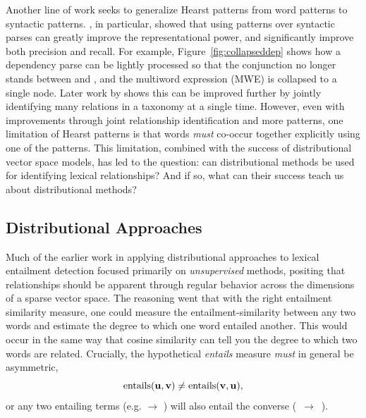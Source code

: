 Another line of work seeks to generalize Hearst patterns from word patterns
to syntactic patterns. , in particular, showed that
using patterns over syntactic parses can greatly improve the representational power,
and significantly improve both precision and recall. For example,
Figure~\ref{fig:collapseddep} shows how a dependency parse can be lightly
processed so that the conjunction  no longer stands between
 and , and the multiword expression (MWE) 
is collapsed to a single node. Later work by  shows
this can be improved further by jointly identifying many relations in a
taxonomy at a single time. However, even with improvements through joint
relationship identification and more patterns, one limitation of Hearst
patterns is that words {\em must} co-occur together explicitly using one of
the patterns. This limitation, combined with the success of distributional
vector space models, has led to the question: can distributional methods be
used for identifying lexical relationships? And if so, what can their
success teach us about distributional methods?

\subsection{Distributional Approaches}
\label{sec:dih}

Much of the earlier work in applying distributional approaches to lexical
entailment detection focused primarily on {\em unsupervised} methods, positing
that relationships should be apparent through regular behavior across the
dimensions of a sparse vector space. The reasoning went that with the
right entailment similarity measure, one could measure the
entailment-similarity between any two words and estimate the degree to which
one word entailed another. This would occur in the same way that cosine
similarity can tell you the degree to which two words are related. Crucially,
the hypothetical {\em entails} measure {\em must} in general be asymmetric,
\begin{equation*}
  \mbox{entails}({\mathbf{u}}, {\mathbf{v}}) \neq \mbox{entails}({\mathbf{v}}, {\mathbf{u}}),
\end{equation*}
or any two entailing terms (e.g.  $\rightarrow$ ) will
also entail the converse \mbox{( $\rightarrow$ )}.

